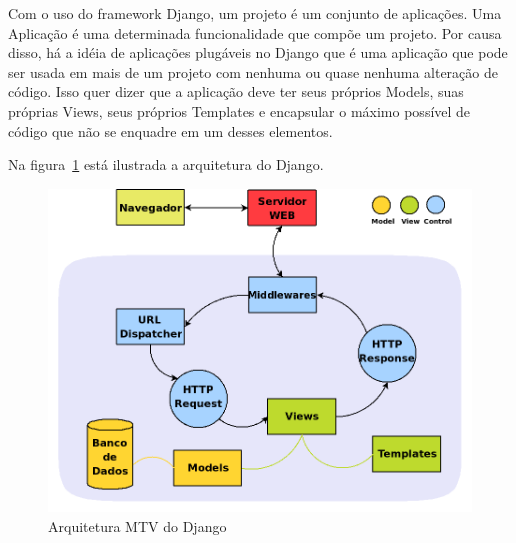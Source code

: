     Com o uso do framework Django, um projeto é um conjunto de aplicações. Uma Aplicação é uma determinada funcionalidade que compõe um projeto. Por causa disso, há a idéia de aplicações plugáveis no Django que é uma aplicação que pode ser usada em mais de um projeto com nenhuma ou quase nenhuma alteração de código. Isso quer dizer que a aplicação deve ter seus próprios Models, suas próprias Views, seus próprios Templates e encapsular o máximo possível de código que não se enquadre em um desses elementos.
    
    Na figura~\ref{django_arquitetura} está ilustrada a arquitetura do Django.

    \begin{figure}
        \begin{center}
    \includegraphics[width=1.0\linewidth]{arquivos/django_arquitetura.png}
        \end{center}
        \caption{Arquitetura MTV do Django}
        \label{django_arquitetura}
    \end{figure}

